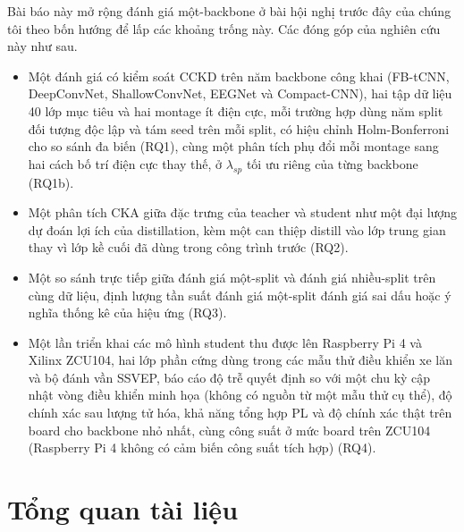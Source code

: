 \documentclass[11pt,a4paper,twoside,asymmetric]{article}
\begin{document}
Bài báo này mở rộng đánh giá một-backbone ở bài hội nghị trước đây của chúng tôi \cite{R82} theo bốn hướng để lấp các khoảng trống này. Các đóng góp của nghiên cứu này như sau.
\begin{itemize}
\item[(i)] Một đánh giá có kiểm soát CCKD trên năm backbone công khai (FB-tCNN, DeepConvNet, ShallowConvNet, EEGNet và Compact-CNN), hai tập dữ liệu 40 lớp mục tiêu và hai montage ít điện cực, mỗi trường hợp dùng năm split đối tượng độc lập và tám seed trên mỗi split, có hiệu chỉnh Holm-Bonferroni cho so sánh đa biến (RQ1), cùng một phân tích phụ đổi mỗi montage sang hai cách bố trí điện cực thay thế, ở $\lambda_{sp}$ tối ưu riêng của từng backbone (RQ1b).
\item[(ii)] Một phân tích CKA giữa đặc trưng của teacher và student như một đại lượng dự đoán lợi ích của distillation, kèm một can thiệp distill vào lớp trung gian thay vì lớp kề cuối đã dùng trong công trình trước (RQ2).
\item[(iii)] Một so sánh trực tiếp giữa đánh giá một-split và đánh giá nhiều-split trên cùng dữ liệu, định lượng tần suất đánh giá một-split đánh giá sai dấu hoặc ý nghĩa thống kê của hiệu ứng (RQ3).
\item[(iv)] Một lần triển khai các mô hình student thu được lên Raspberry Pi 4 và Xilinx ZCU104, hai lớp phần cứng dùng trong các mẫu thử điều khiển xe lăn và bộ đánh vần SSVEP, báo cáo độ trễ quyết định so với một chu kỳ cập nhật vòng điều khiển minh họa (không có nguồn từ một mẫu thử cụ thể), độ chính xác sau lượng tử hóa, khả năng tổng hợp PL và độ chính xác thật trên board cho backbone nhỏ nhất, cùng công suất ở mức board trên ZCU104 (Raspberry Pi 4 không có cảm biến công suất tích hợp) (RQ4).
\end{itemize}

\section{Tổng quan tài liệu}
\end{document}
